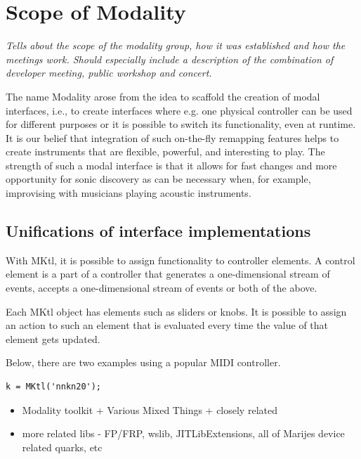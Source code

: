 \documentclass{article}
\begin{document}
\section{Scope of Modality}
\label{sec:scope_of_modality_tech_info_where_what}

\emph{Tells about the scope of the modality group, how it was established and how the meetings work. Should especially include a description of the combination of developer meeting, public workshop and concert.}

The name Modality arose from the idea to scaffold the creation of modal interfaces, i.e., to create interfaces where e.g. one physical controller can be used for different purposes or it is possible to switch its functionality, even at runtime. It is our belief that integration of such on-the-fly remapping features helps to create instruments that are flexible, powerful, and interesting to play. The strength of such a modal interface is that it allows for fast changes and more opportunity for sonic discovery as can be necessary when, for example, improvising with musicians playing acoustic instruments. 


\subsection{Unifications of interface implementations}
\label{sub:unifications_of_interface_implementations}

With MKtl, it is possible to assign functionality to controller elements.  A control element is a part of a controller that generates a one-dimensional stream of events, accepts a one-dimensional stream of events or both of the above.

Each MKtl object has elements such as sliders or knobs. It is possible to assign an action to such an element that is evaluated every time the value of that element gets updated. 

 Below, there are two examples using a popular MIDI controller.

\begin{Verbatim}
k = MKtl('nnkn20');
\end{Verbatim}



\begin{itemize}
	\item Modality toolkit + Various Mixed Things + closely related
	\item more related libs - FP/FRP, wslib, JITLibExtensions, 
		all of Marijes device related quarks, etc 
\end{itemize}
\end{document}
